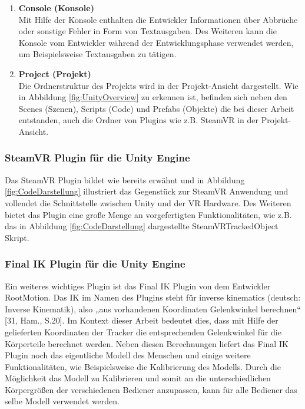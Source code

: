 \begin{enumerate}
	\item \textbf{Console (Konsole)} \\
	Mit Hilfe der Konsole enthalten die Entwickler Informationen über Abbrüche oder sonstige Fehler in Form von Textausgaben. Des Weiteren kann die Konsole vom Entwickler während der Entwicklungsphase verwendet werden, um Beispielsweise Textausgaben zu tätigen.
	\item \textbf{Project (Projekt)} \\
	Die Ordnerstruktur des Projekts wird in der Projekt-Ansicht dargestellt. Wie in Abbildung \ref{fig:UnityOverview} zu erkennen ist, befinden sich neben den Scenes (Szenen), Scripts (Code) und Prefabs (Objekte) die bei dieser Arbeit entstanden, auch die Ordner von Plugins wie z.B. SteamVR in der Projekt-Ansicht.
\end{enumerate}

\subsubsection{SteamVR Plugin für die Unity Engine}\label{sec:SteamVRPlugin}
Das SteamVR Plugin bildet wie bereits erwähnt und in Abbildung \ref{fig:CodeDarstellung} illustriert das Gegenstück zur SteamVR Anwendung und vollendet die Schnittstelle zwischen Unity und der VR Hardware. Des Weiteren bietet das Plugin eine große Menge an vorgefertigten Funktionalitäten, wie z.B. das in Abbildung \ref{fig:CodeDarstellung} dargestellte SteamVRTrackedObject Skript.

\subsubsection{Final IK Plugin für die Unity Engine}\label{sec:FinalIKPlugin}
Ein weiteres wichtiges Plugin ist das Final IK Plugin von dem Entwickler RootMotion. Das IK im Namen des Plugins steht für inverse kinematics (deutsch: Inverse Kinematik), also „aus vorhandenen Koordinaten Gelenkwinkel berechnen“ [31, Ham., S.20]. Im Kontext dieser Arbeit bedeutet dies, dass mit Hilfe der gelieferten Koordinaten der Tracker die entsprechenden Gelenkwinkel für die Körperteile berechnet werden. Neben diesen Berechnungen liefert das Final IK Plugin noch das eigentliche Modell des Menschen und einige weitere Funktionalitäten, wie Beispielsweise die Kalibrierung des Modells. Durch die Möglichkeit das Modell zu Kalibrieren und somit an die unterschiedlichen Körpergrößen der verschiedenen Bediener anzupassen, kann für alle Bediener das selbe Modell verwendet werden.

